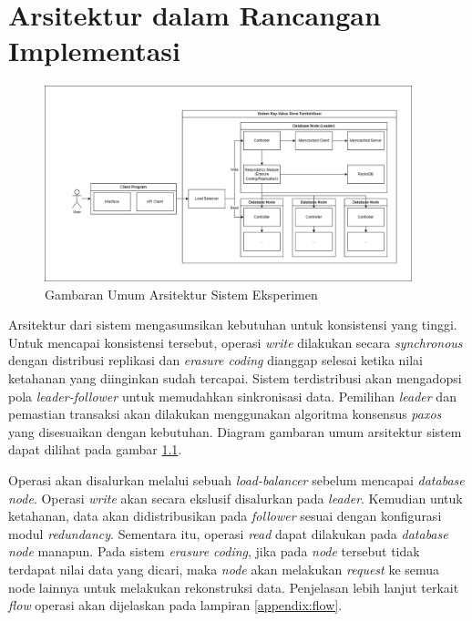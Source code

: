 \chapter{Arsitektur dalam Rancangan Implementasi}
\label{appendix:architecture}

\begin{figure}[ht]
    \centering
    \includegraphics[width=0.95\textwidth]{resources/appendix/general-architecture.png}
    \caption{Gambaran Umum Arsitektur Sistem Eksperimen}
    \label{fig:general-architecture}
\end{figure}

Arsitektur dari sistem mengasumsikan kebutuhan untuk konsistensi yang tinggi. Untuk mencapai konsistensi tersebut, operasi \textit{write} dilakukan secara \textit{synchronous} dengan distribusi replikasi dan \textit{erasure coding} dianggap selesai ketika nilai ketahanan yang diinginkan sudah tercapai. Sistem terdistribusi akan mengadopsi pola \textit{leader-follower} untuk memudahkan sinkronisasi data. Pemilihan \textit{leader} dan pemastian transaksi akan dilakukan menggunakan algoritma konsensus \textit{paxos} yang disesuaikan dengan kebutuhan. Diagram gambaran umum arsitektur sistem dapat dilihat pada gambar \ref{fig:general-architecture}.

Operasi akan disalurkan melalui sebuah \textit{load-balancer} sebelum mencapai \textit{database node}. Operasi \textit{write} akan secara ekslusif disalurkan pada \textit{leader}. Kemudian untuk ketahanan, data akan didistribusikan pada \textit{follower} sesuai dengan konfigurasi modul \textit{redundancy}. Sementara itu, operasi \textit{read} dapat dilakukan pada \textit{database node} manapun. Pada sistem \textit{erasure coding}, jika pada \textit{node} tersebut tidak terdapat nilai data yang dicari, maka \textit{node} akan melakukan \textit{request} ke semua node lainnya untuk melakukan rekonstruksi data. Penjelasan lebih lanjut terkait \textit{flow} operasi akan dijelaskan pada lampiran \ref{appendix:flow}.

